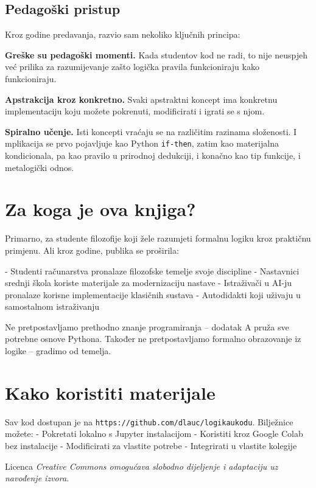 \subsection*{Pedagoški pristup}

Kroz godine predavanja, razvio sam nekoliko ključnih principa:

\textbf{Greške su pedagoški momenti.} Kada studentov kod ne radi, to nije neuspjeh već prilika za razumijevanje zašto logička pravila funkcioniraju kako funkcioniraju.

\textbf{Apstrakcija kroz konkretno.} Svaki apstraktni koncept ima konkretnu implementaciju koju možete pokrenuti,
modificirati i igrati se s njom.

\textbf{Spiralno učenje.} Isti koncepti vraćaju se na različitim razinama složenosti. I
mplikacija se prvo pojavljuje kao Python \texttt{if-then}, zatim kao materijalna kondicionala,
pa kao pravilo u prirodnoj dedukciji, i konačno kao tip funkcije, i metalogički odnos.

\section*{Za koga je ova knjiga?}

Primarno, za studente filozofije koji žele razumjeti formalnu logiku kroz praktičnu primjenu.
Ali kroz godine, publika se proširila:

- Studenti računarstva pronalaze filozofske temelje svoje discipline
- Nastavnici srednji škola koriste materijale za modernizaciju nastave
- Istraživači u AI-ju pronalaze korisne implementacije klasičnih sustava
- Autodidakti koji uživaju u samostalnom istraživanju

Ne pretpostavljamo prethodno znanje programiranja – dodatak A pruža sve potrebne osnove Pythona.
Također ne pretpostavljamo formalno obrazovanje iz logike – gradimo od temelja.

\section*{Kako koristiti materijale}

Sav kod dostupan je na \texttt{https://github.com/dlauc/logikaukodu}. Bilježnice možete:
- Pokretati lokalno s Jupyter instalacijom
- Koristiti kroz Google Colab bez instalacije
- Modificirati za vlastite potrebe
- Integrirati u vlastite kolegije

Licenca \em{Creative Commons} omogućava slobodno dijeljenje i adaptaciju uz navođenje izvora.


